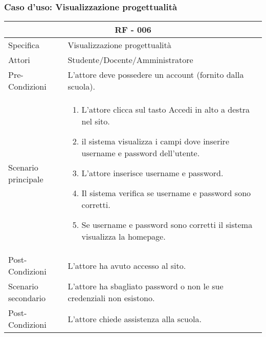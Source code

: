\documentclass{article}
\begin{document}
\subsubsection{\textbf{Caso d'uso: Visualizzazione progettualità}}
\begin{tabular}{ |p{3cm}|p{9cm}|  }
	\hline
	\multicolumn{2}{|c|}{\textbf{RF - 006}} \\
	\hline
	Specifica& Visualizzazione progettualità\\
	\hline
	Attori& Studente/Docente/Amministratore\\
	\hline
	Pre-Condizioni& L'attore deve possedere un account (fornito dalla scuola).\\
	\hline
	Scenario principale& \begin{enumerate}
		\item L'attore clicca sul tasto Accedi in alto a destra nel sito.
		\item il sistema visualizza i campi dove inserire username e password dell'utente.
		\item L'attore inserisce username e password.
		\item Il sistema verifica se username e password sono corretti.
		\item Se username e password sono corretti il sistema visualizza la homepage.
	\end{enumerate}\\
	\hline
	Post-Condizioni& L'attore ha avuto accesso al sito.\\
	\hline
	Scenario secondario& L'attore ha sbagliato password o non le sue credenziali non esistono.\\
	\hline
	Post-Condizioni& L'attore chiede assistenza alla scuola.\\
	\hline
\end{tabular}
\end{document}
